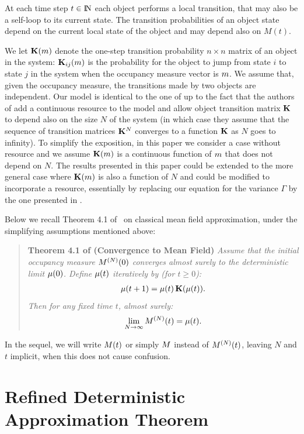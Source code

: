 \documentclass{elsarticle}
\begin{document}
At each time step $t \in \mathrm{I\!N}$ each object performs a local
transition, that may also be a self-loop to its current state.  The
transition probabilities of an object state depend on the current
local state of the object and may depend also on $M(t)$.

We let $\mathbf{K}(m)$ denote the one-step transition probability
$n \times n$ matrix of an object in the system: $\mathbf{K}_{ij}(m)$
is the probability for the object to jump from state $i$ to state $j$
in the system when the occupancy measure vector is $m$. We assume
that, given the occupancy measure, the transitions made by two objects
are independent. Our model is identical to the one of \cite{Le+07} up
to the fact that the authors of \cite{Le+07} add a continuous resource
to the model and allow object transition matrix $\mathbf{K}$ to depend also on
the size $N$ of the system (in which case they assume
that the sequence of transition matrices $\mathbf{K}^N$ converges to a function
$\mathbf{K}$ as $N$ goes to infinity). To simplify the exposition, in this
paper we consider a case without resource and we assume
$\mathbf{K}(m)$ is a continuous function of $m$ that does not
depend on $N$. The results presented in this paper could be extended
to the more general case where $\mathbf{K}(m)$ is also a function of
$N$ and could be modified to incorporate a resource, essentially by
replacing our equation for the variance $\Gamma$ by the one presented
in \cite[Equation~(7)]{gastgaujalDEDS}.

Below we recall Theorem 4.1 of~\cite{Le+07} on classical mean field
approximation, under the simplifying assumptions mentioned above:

\begin{quotation}
\noindent
{\bf Theorem 4.1 of \cite{Le+07} (Convergence to Mean Field)}
{\em Assume that the initial occupancy measure $M^{(N)}(0)$ converges almost surely to the deterministic limit $\mu(0)$. 
Define $\mu(t)$ iteratively by (for $t \geq 0$):
\begin{align}
  \label{eq:mu}
  \mu(t+1) = \mu(t) \, \mathbf{K}(\mu(t)).
\end{align}
Then for any fixed time $t$, almost surely:
$$
\lim_{N \to \infty} M^{(N)}(t) = \mu(t).
$$
}
\end{quotation}
In the sequel, we will write $M(t)$ or simply $M$ instead of
$M^{(N)}(t)$, leaving $N$ and $t$ implicit, when this does not cause
confusion.

\section{Refined Deterministic Approximation Theorem}
\label{sect:Refined}
\end{document}
